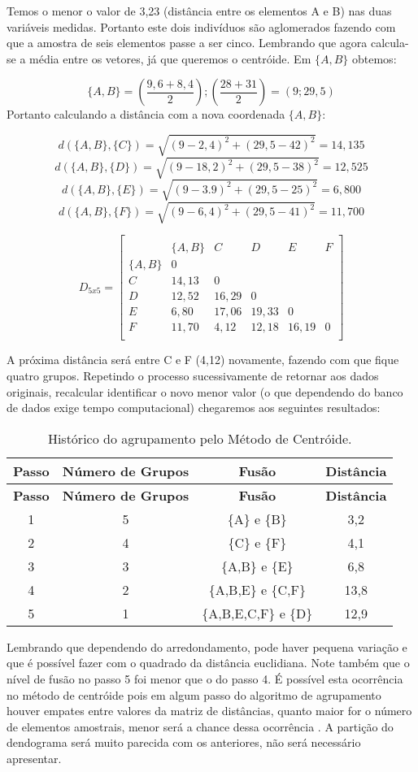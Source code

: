 \documentclass[
  openany]{book}
\begin{document}
Temos o menor o valor de 3,23 (distância entre os elementos A e B) nas duas variáveis medidas. Portanto este dois indivíduos são aglomerados fazendo com que a amostra de seis elementos passe a ser cinco. Lembrando que agora calcula-se a média entre os vetores, já que queremos o centróide. Em \(\{A,B\}\) obtemos:

\[\{A,B\}=(\frac{9,6+8,4}{2});(\frac{28+31}{2})=(9;29,5)\]
Portanto calculando a distância com a nova coordenada \(\{A,B\}\):

\[d(\{A,B\},\{C\})=\sqrt{(9-2,4)^2+(29,5-42)^2}=14,135\]
\[d(\{A,B\},\{D\})=\sqrt{(9-18,2)^2+(29,5-38)^2}=12,525\]
\[d(\{A,B\},\{E\})=\sqrt{(9-3.9)^2+(29,5-25)^2}=6,800\]
\[d(\{A,B\},\{F\})=\sqrt{(9-6,4)^2+(29,5-41)^2}=11,700\]

\[D_{5x5}=\begin{bmatrix}\\
 &\{A,B\}&C&D&E&F \\
 \{A,B\}&0&&&&\\
 C & 14,13&0&&&\\
 D& 12,52& 16,29&0&&\\
 E& 6,80& 17,06& 19,33&0&\\
 F& 11,70& 4,12& 12,18& 16,19&0 \\
\end{bmatrix}\]

A próxima distância será entre C e F (4,12) novamente, fazendo com que fique quatro grupos. Repetindo o processo sucessivamente de retornar aos dados originais, recalcular identificar o novo menor valor (o que dependendo do banco de dados exige tempo computacional) chegaremos aos seguintes resultados:

\begin{longtable}[]{@{}cccc@{}}
\caption{\label{tab:ligcent} Histórico do agrupamento pelo Método de Centróide.}\tabularnewline
\toprule
\textbf{Passo} & \textbf{Número de Grupos} & \textbf{Fusão} & \textbf{Distância}\tabularnewline
\midrule
\endfirsthead
\toprule
\textbf{Passo} & \textbf{Número de Grupos} & \textbf{Fusão} & \textbf{Distância}\tabularnewline
\midrule
\endhead
1 & 5 & \{A\} e \{B\} & 3,2\tabularnewline
2 & 4 & \{C\} e \{F\} & 4,1\tabularnewline
3 & 3 & \{A,B\} e \{E\} & 6,8\tabularnewline
4 & 2 & \{A,B,E\} e \{C,F\} & 13,8\tabularnewline
5 & 1 & \{A,B,E,C,F\} e \{D\} & 12,9\tabularnewline
\bottomrule
\end{longtable}

Lembrando que dependendo do arredondamento, pode haver pequena variação e que é possível fazer com o quadrado da distância euclidiana. Note também que o nível de fusão no passo 5 foi menor que o do passo 4. É possível esta ocorrência no método de centróide pois em algum passo do algoritmo de agrupamento houver empates entre valores da matriz de distâncias, quanto maior for o número de elementos amostrais, menor será a chance dessa ocorrência \citep{mingoti2007analise}. A partição do dendograma será muito parecida com os anteriores, não será necessário apresentar.
\end{document}
